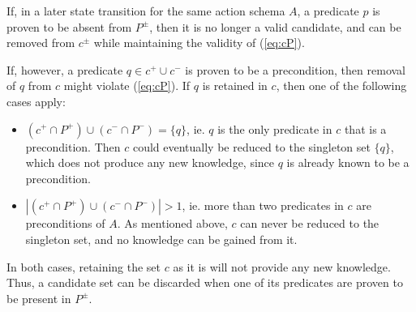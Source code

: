 \documentclass[../Master.tex]{subfiles}
\begin{document}
If, in a later state transition for the same action schema $A$, a predicate $p$
is proven to be absent from $P^{\pm}$, then it is no longer a valid candidate,
and can be removed from $c^{\pm}$ while maintaining the validity of
(\ref{eq:cP}).

If, however, a predicate $q\in c^{+}\cup c^{-}$ is proven to be a precondition,
then removal of $q$ from $c$ might violate (\ref{eq:cP}). If $q$ is retained in
$c$, then one of the following cases apply: \begin{itemize} \item
$\left(c^{+}\cap P^{+}\right)\cup\left(c^{-}\cap P^{-}\right)=\{q\}$, ie. $q$ is
the only predicate in $c$ that is a precondition. Then $c$ could eventually be
reduced to the singleton set $\{q\}$, which does not produce any new knowledge,
since $q$ is already known to be a precondition. \item $\left|\left(c^{+}\cap
P^{+}\right)\cup\left(c^{-}\cap P^{-}\right)\right|>1$, ie. more than two
predicates in $c$ are preconditions of $A$. As mentioned above, $c$ can never be
reduced to the singleton set, and no knowledge can be gained from it.
\end{itemize} In both cases, retaining the set $c$ as it is will not provide any
new knowledge. Thus, a candidate set can be discarded when one of its predicates
are proven to be present in $P^{\pm}$.
\end{document}
